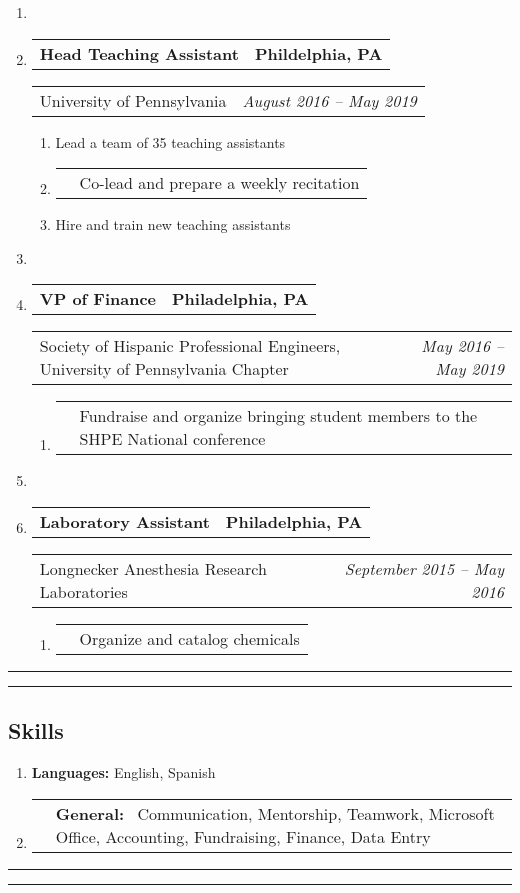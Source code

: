 \documentclass[letterpaper]{article}
\makeatletter
\newcommand*{\tabulardef}[3]{\begin{tabular}[t]{@{}lp{\dimexpr\linewidth-#1}@{}}
    #2&#3
\end{tabular}}
\newcommand{\headerrow}[2]
{\begin{tabular*}{\linewidth}{l@{\extracolsep{\fill}}r}
	#1 &
	#2 \\
\end{tabular*}}
\makeatother
\begin{document}
\begin{enumerate}[label=]
    \item

	\item
		\headerrow
			{\textbf{Head Teaching Assistant}}
            {\textbf{Phildelphia, PA}}
	\headerrow
        {University of Pennsylvania}
		{\emph{August 2016 -- May 2019}}
	\begin{enumerate}[label= *]
		\parskip=-0.1em
        \item Lead a team of 35 teaching assistants
        \item\tabulardef{5cm}{}{Co-lead and prepare a weekly recitation}
		\item Hire and train new teaching assistants
	\end{enumerate}

    \item

    \item
        \headerrow
            {\textbf{VP of Finance}}
            {\textbf{Philadelphia, PA}}
        \headerrow
           {Society of Hispanic Professional Engineers, University of Pennsylvania Chapter}
           {\emph{May 2016 -- May 2019}}
       \begin{enumerate}[label= *]
           \parskip=-0.1em
           \item\tabulardef{5cm}{}{Fundraise and organize bringing student members to the SHPE National conference}
       \end{enumerate}

    \item

    \item
        \headerrow
            {\textbf{Laboratory Assistant}}
            {\textbf{Philadelphia, PA}}
        \headerrow
           {Longnecker Anesthesia Research Laboratories}
           {\emph{September 2015 -- May 2016}}
       \begin{enumerate}[label= *]
           \parskip=-0.1em
           \item\tabulardef{5cm}{}{Organize and catalog chemicals}
       \end{enumerate}
\end{enumerate}

\hrule\hrule
\vspace{-0.6em}
\subsection*{Skills}
\begin{enumerate}[label=]
	\parskip=-0.25em

	\item
	\textbf{Languages: } English, Spanish

	\item\tabulardef{1cm}{}{\textbf{General:} \ Communication, Mentorship, Teamwork, Microsoft Office, Accounting, Fundraising, Finance, Data Entry}
	
\end{enumerate}

\hrule\hrule
\end{document}
